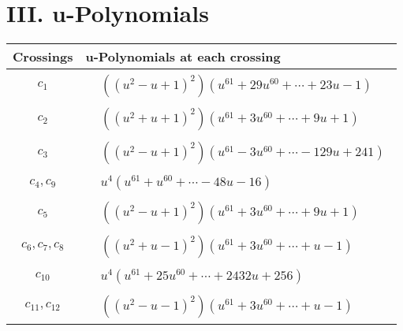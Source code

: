 \documentclass[1p]{elsarticle_modified}
\theoremstyle{definition}
\begin{document}
\newpage\renewcommand{\arraystretch}{1}
\centering \section*{ III. u-Polynomials}
\begin{tabular}{m{50pt}|m{274pt}}
Crossings & \hspace{64pt}u-Polynomials at each crossing \\
\hline $$\begin{aligned}c_{1}\end{aligned}$$&$\begin{aligned}
&((u^2- u+1)^2)(u^{61}+29 u^{60}+\cdots+23 u-1)
\end{aligned}$\\
\hline $$\begin{aligned}c_{2}\end{aligned}$$&$\begin{aligned}
&((u^2+u+1)^2)(u^{61}+3 u^{60}+\cdots+9 u+1)
\end{aligned}$\\
\hline $$\begin{aligned}c_{3}\end{aligned}$$&$\begin{aligned}
&((u^2- u+1)^2)(u^{61}-3 u^{60}+\cdots-129 u+241)
\end{aligned}$\\
\hline $$\begin{aligned}c_{4},c_{9}\end{aligned}$$&$\begin{aligned}
&u^4(u^{61}+u^{60}+\cdots-48 u-16)
\end{aligned}$\\
\hline $$\begin{aligned}c_{5}\end{aligned}$$&$\begin{aligned}
&((u^2- u+1)^2)(u^{61}+3 u^{60}+\cdots+9 u+1)
\end{aligned}$\\
\hline $$\begin{aligned}c_{6},c_{7},c_{8}\end{aligned}$$&$\begin{aligned}
&((u^2+u-1)^2)(u^{61}+3 u^{60}+\cdots+u-1)
\end{aligned}$\\
\hline $$\begin{aligned}c_{10}\end{aligned}$$&$\begin{aligned}
&u^4(u^{61}+25 u^{60}+\cdots+2432 u+256)
\end{aligned}$\\
\hline $$\begin{aligned}c_{11},c_{12}\end{aligned}$$&$\begin{aligned}
&((u^2- u-1)^2)(u^{61}+3 u^{60}+\cdots+u-1)
\end{aligned}$\\
\hline
\end{tabular}\newpage\renewcommand{\arraystretch}{1}
\end{document}
